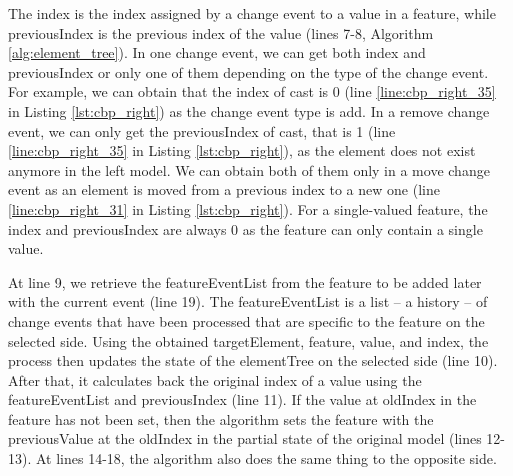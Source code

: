 The \textsf{index} is the index assigned by a change event to a value in a feature, while \textsf{previousIndex} is the previous index of the value (lines 7-8, Algorithm \ref{alg:element_tree}). In one change event, we can get both \textsf{index} and \textsf{previousIndex} or only one of them depending on the type of the change event. For example, we can obtain that the \textsf{index} of \textsf{cast} is 0 (line \ref{line:cbp_right_35} in Listing \ref{lst:cbp_right}) as the change event type is \textsf{add}. In a \textsf{remove} change event, we can only get the \textsf{previousIndex} of \textsf{cast}, that is 1 (line \ref{line:cbp_right_35} in Listing \ref{lst:cbp_right}), as the element does not exist anymore in the left model. We can obtain both of them only in a \textsf{move} change event as an element is moved from a previous index to a new one (line \ref{line:cbp_right_31} in Listing \ref{lst:cbp_right}). For a single-valued feature, the \textsf{index} and \textsf{previousIndex} are always 0 as the feature can only contain a single value. 

At line 9, we retrieve the \textsf{featureEventList} from the \textsf{feature} to be added later with the current \textsf{event} (line 19). The \textsf{featureEventList} is a list -- a history -- of change events that have been processed that are specific to the \textsf{feature} on the selected \textsf{side}. Using the obtained \textsf{targetElement}, \textsf{feature}, \textsf{value}, and \textsf{index}, the process then updates the state of the \textsf{elementTree} on the selected \textsf{side} (line 10). After that, it calculates back the original index of a value using the \textsf{featureEventList} and \textsf{previousIndex} (line 11). If the value at \textsf{oldIndex} in the \textsf{feature} has not been set, then the algorithm sets the \textsf{feature} with the \textsf{previousValue} at the \textsf{oldIndex} in the partial state of the original model (lines 12-13). At lines 14-18, the algorithm also does the same thing to the opposite side.


